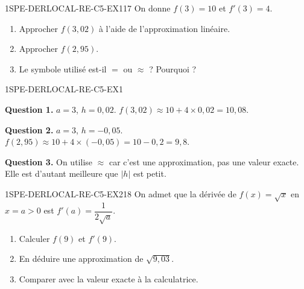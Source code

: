 

\begin{exercice}{1SPE-DERLOCAL-RE-C5-EX1}{1}{7}
On donne $f(3) = 10$ et $f'(3) = 4$.
\begin{enumerate}
  \item Approcher $f(3{,}02)$ à l'aide de l'approximation linéaire.
  \item Approcher $f(2{,}95)$.
  \item Le symbole utilisé est-il $=$ ou $\approx$ ? Pourquoi ?
\end{enumerate}
\end{exercice}



\begin{corrige}{1SPE-DERLOCAL-RE-C5-EX1}


\textbf{Question 1.}
$a = 3$, $h = 0{,}02$. $f(3{,}02) \approx 10 + 4 \times 0{,}02 = 10{,}08.$

\textbf{Question 2.}
$a = 3$, $h = -0{,}05$. $f(2{,}95) \approx 10 + 4 \times (-0{,}05) = 10 - 0{,}2 = 9{,}8.$

\textbf{Question 3.}
On utilise $\approx$ car c'est une approximation, pas une valeur exacte. Elle est d'autant meilleure que $|h|$ est petit.

\end{corrige}


\begin{exercice}{1SPE-DERLOCAL-RE-C5-EX2}{1}{8}
On admet que la dérivée de $f(x) = \sqrt{x}$ en $x = a > 0$ est $f'(a) = \dfrac{1}{2\sqrt{a}}$.
\begin{enumerate}
  \item Calculer $f(9)$ et $f'(9)$.
  \item En déduire une approximation de $\sqrt{9{,}03}$.
  \item Comparer avec la valeur exacte à la calculatrice.
\end{enumerate}
\end{exercice}


